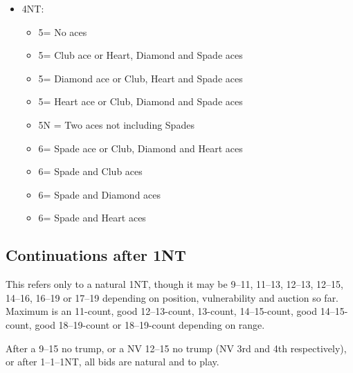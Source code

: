 \documentclass[a4paper,14pt]{extarticle}
\begin{document}
\begin{itemize}
\item 4NT:
	\begin{itemize}
	\item 5\clubs = No aces
	\item 5\diamonds = Club ace or Heart, Diamond and Spade aces
	\item 5\hearts = Diamond ace or Club, Heart and Spade aces
	\item 5\spades = Heart ace or Club, Diamond and Spade aces
	\item 5N = Two aces not including Spades
	\item 6\clubs = Spade ace or Club, Diamond and Heart aces
	\item 6\diamonds = Spade and Club aces
	\item 6\hearts = Spade and Diamond aces
	\item 6\spades = Spade and Heart aces
	\end{itemize}

\end{itemize}

\newpage

\subsection{Continuations after 1NT}
\label{sec:resp:1n}


This refers only to a natural 1NT, though it may be 9--11, 11--13, 12--13,
12--15, 14--16, 16--19 or 17--19 depending on position, vulnerability and
auction so far.  Maximum is an 11-count, good 12--13-count, 13-count,
14--15-count, good 14--15-count, good 18--19-count or 18--19-count depending on
range.

After a 9--15 no trump, or a NV 12--15 no trump (NV 3rd and 4th respectively),
or after 1\clubs--1\diamonds--1NT, all bids are natural and to play.
\end{document}
